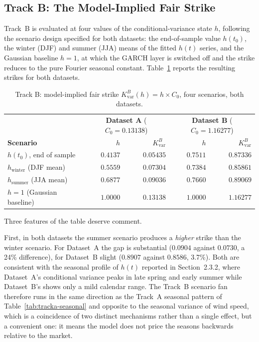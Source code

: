 \documentclass[11pt, a4paper, twoside]{article}
\begin{document}
\subsection{Track B: The Model-Implied Fair Strike}
\label{sec:trackb}

Track~B is evaluated at four values of the conditional-variance state $h$, following the scenario design specified for both datasets: the end-of-sample value $h(t_0)$, the winter (DJF) and summer (JJA) means of the fitted $h(t)$ series, and the Gaussian baseline $h = 1$, at which the GARCH layer is switched off and the strike reduces to the pure Fourier seasonal constant. Table~\ref{tab:trackb} reports the resulting strikes for both datasets.

\begin{table}[htbp]
\centering
\small
\caption{Track B: model-implied fair strike $K_{\text{var}}^B(h) = h \times C_0$, four scenarios, both datasets.}
\label{tab:trackb}
\begin{tabular}{l r r r r}
\toprule
& \multicolumn{2}{c}{\textbf{Dataset A} ($C_0 = 0.13138$)} & \multicolumn{2}{c}{\textbf{Dataset B} ($C_0 = 1.16277$)} \\
\textbf{Scenario} & \textbf{$h$} & \textbf{$K_{\text{var}}^B$} & \textbf{$h$} & \textbf{$K_{\text{var}}^B$} \\
\midrule
$h(t_0)$, end of sample & $0.4137$ & $0.05435$ & $0.7511$ & $0.87336$ \\
$h_{\text{winter}}$ (DJF mean) & $0.5559$ & $0.07304$ & $0.7384$ & $0.85861$ \\
$h_{\text{summer}}$ (JJA mean) & $0.6877$ & $0.09036$ & $0.7660$ & $0.89069$ \\
$h = 1$ (Gaussian baseline) & $1.0000$ & $0.13138$ & $1.0000$ & $1.16277$ \\
\bottomrule
\end{tabular}
\end{table}

Three features of the table deserve comment.

First, in both datasets the summer scenario produces a \emph{higher} strike than the winter scenario. For Dataset~A the gap is substantial ($0.0904$ against $0.0730$, a 24\% difference), for Dataset~B slight ($0.8907$ against $0.8586$, 3.7\%). Both are consistent with the seasonal profile of $h(t)$ reported in Section~2.3.2, where Dataset~A's conditional variance peaks in late spring and early summer while Dataset~B's shows only a mild calendar range. The Track~B scenario fan therefore runs in the same direction as the Track~A seasonal pattern of Table~\ref{tab:tracka-seasonal} and opposite to the seasonal variance of wind speed, which is a coincidence of two distinct mechanisms rather than a single effect, but a convenient one: it means the model does not price the seasons backwards relative to the market.
\end{document}
